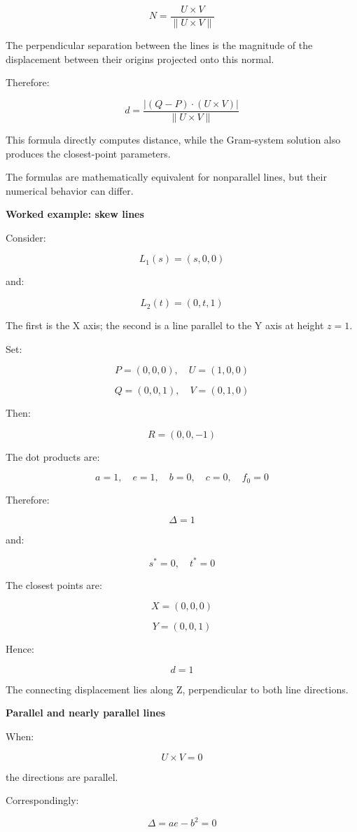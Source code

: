 \[
N=\frac{U\times V}{\|U\times V\|}
\]

The perpendicular separation between the lines is the magnitude of the displacement between their origins projected onto this normal.

Therefore:

\[
\boxed{ d= \frac{|(Q-P)\cdot(U\times V)|} {\|U\times V\|} }
\]

This formula directly computes distance, while the Gram-system solution also produces the closest-point parameters.

The formulas are mathematically equivalent for nonparallel lines, but their numerical behavior can differ.

\textbf{Worked example: skew lines}

Consider:

\[
L_1(s)=(s,0,0)
\]

and:

\[
L_2(t)=(0,t,1)
\]

The first is the X axis; the second is a line parallel to the Y axis at height \(z=1\).

Set:

\[
P=(0,0,0),\quad U=(1,0,0)
\]

\[
Q=(0,0,1),\quad V=(0,1,0)
\]

Then:

\[
R=(0,0,-1)
\]

The dot products are:

\[
a=1,\quad e=1,\quad b=0,\quad c=0,\quad f_0=0
\]

Therefore:

\[
\Delta=1
\]

and:

\[
s^*=0,\quad t^*=0
\]

The closest points are:

\[
X=(0,0,0)
\]

\[
Y=(0,0,1)
\]

Hence:

\[
\boxed{d=1}
\]

The connecting displacement lies along Z, perpendicular to both line directions.

\textbf{Parallel and nearly parallel lines}

When:

\[
U\times V=0
\]

the directions are parallel.

Correspondingly:

\[
\Delta=ae-b^2=0
\]

